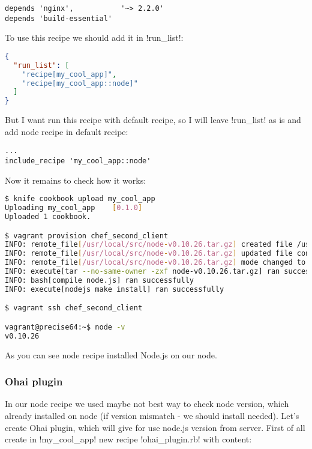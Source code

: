 \begin{lstlisting}[label=lst:cookbook-ohai-meta]
depends 'nginx',           '~> 2.2.0'
depends 'build-essential'
\end{lstlisting}

To use this recipe we should add it in \inline!run_list!:

\begin{lstlisting}[language=JSON,label=lst:cookbook-ohai2]
{
  "run_list": [
    "recipe[my_cool_app]",
    "recipe[my_cool_app::node]"
  ]
}
\end{lstlisting}

But I want run this recipe with default recipe, so I will leave \inline!run_list! as is and add node recipe in default recipe:

\begin{lstlisting}[label=lst:cookbook-ohai3]
...
include_recipe 'my_cool_app::node'
\end{lstlisting}

Now it remains to check how it works:

\begin{lstlisting}[language=Bash,label=lst:cookbook-ohai4]
$ knife cookbook upload my_cool_app
Uploading my_cool_app    [0.1.0]
Uploaded 1 cookbook.

$ vagrant provision chef_second_client
INFO: remote_file[/usr/local/src/node-v0.10.26.tar.gz] created file /usr/local/src/node-v0.10.26.tar.gz
INFO: remote_file[/usr/local/src/node-v0.10.26.tar.gz] updated file contents /usr/local/src/node-v0.10.26.tar.gz
INFO: remote_file[/usr/local/src/node-v0.10.26.tar.gz] mode changed to 644
INFO: execute[tar --no-same-owner -zxf node-v0.10.26.tar.gz] ran successfully
INFO: bash[compile node.js] ran successfully
INFO: execute[nodejs make install] ran successfully

$ vagrant ssh chef_second_client

vagrant@precise64:~$ node -v
v0.10.26
\end{lstlisting}

As you can see node recipe installed Node.js on our node.

\subsubsection{Ohai plugin}

In our node recipe we used maybe not best way to check node version, which already installed on node (if version mismatch - we should install needed). Let's create Ohai plugin, which will give for use node.js version from server. First of all create in \inline!my_cool_app! new recipe \inline!ohai_plugin.rb! with content:

